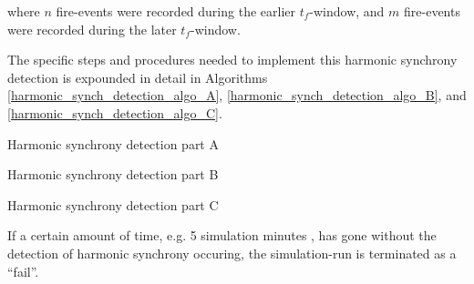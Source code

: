 	where $n$ fire-events were recorded during the earlier $t_f$-window, and $m$ fire-events were recorded during the later $t_f$-window.


	The specific steps and procedures needed to implement this harmonic synchrony detection is expounded in detail in Algorithms \ref{harmonic_synch_detection_algo_A}, \ref{harmonic_synch_detection_algo_B}, and \ref{harmonic_synch_detection_algo_C}.

	\begin{algorithm}
	\caption{Harmonic synchrony detection part A }\label{harmonic_synch_detection_algo_A}
	\end{algorithm}

	\begin{algorithm}
	\caption{Harmonic synchrony detection part B }\label{harmonic_synch_detection_algo_B}
	\end{algorithm}

	\begin{algorithm}
	\caption{Harmonic synchrony detection part C }\label{harmonic_synch_detection_algo_C}
	\end{algorithm}

	If a certain amount of time, e.g. 5 simulation minutes \cite{nymoen_synch}, has gone without the detection of harmonic synchrony occuring, the simulation-run is terminated as a ``fail''.


